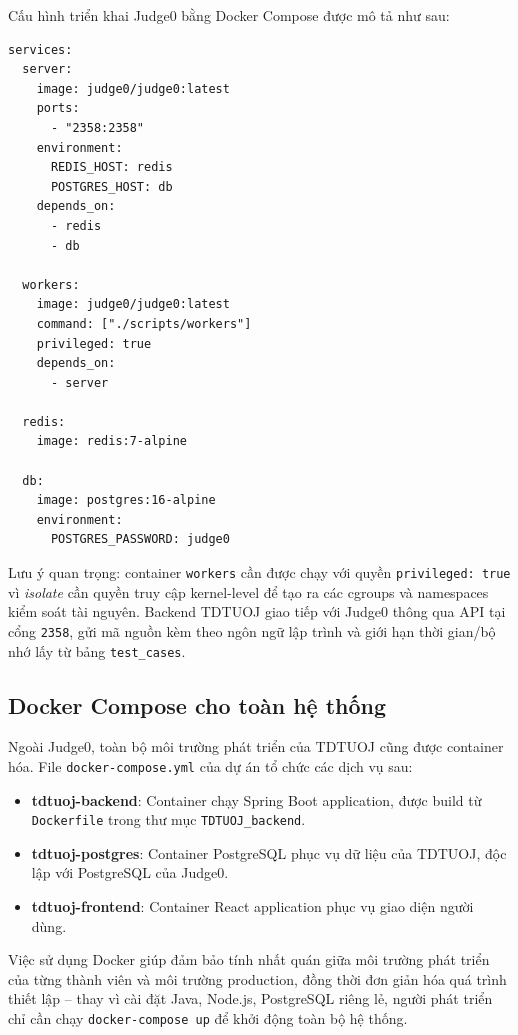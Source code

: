 \documentclass[12pt, a4paper]{report}
\begin{document}
Cấu hình triển khai Judge0 bằng Docker Compose được mô tả như sau:

\begin{verbatim}
services:
  server:
    image: judge0/judge0:latest
    ports:
      - "2358:2358"
    environment:
      REDIS_HOST: redis
      POSTGRES_HOST: db
    depends_on:
      - redis
      - db

  workers:
    image: judge0/judge0:latest
    command: ["./scripts/workers"]
    privileged: true
    depends_on:
      - server

  redis:
    image: redis:7-alpine

  db:
    image: postgres:16-alpine
    environment:
      POSTGRES_PASSWORD: judge0
\end{verbatim}

Lưu ý quan trọng: container \texttt{workers} cần được chạy với quyền \texttt{privileged: true} vì \textit{isolate} cần quyền truy cập kernel-level để tạo ra các cgroups và namespaces kiểm soát tài nguyên. Backend TDTUOJ giao tiếp với Judge0 thông qua \ac{API} tại cổng \texttt{2358}, gửi mã nguồn kèm theo ngôn ngữ lập trình và giới hạn thời gian/bộ nhớ lấy từ bảng \texttt{test\_cases}.

\subsection{Docker Compose cho toàn hệ thống}

Ngoài Judge0, toàn bộ môi trường phát triển của TDTUOJ cũng được container hóa. File \texttt{docker-compose.yml} của dự án tổ chức các dịch vụ sau:

\begin{itemize}
  \item \textbf{tdtuoj-backend}: Container chạy Spring Boot application, được build từ \texttt{Dockerfile} trong thư mục \texttt{TDTUOJ\_backend}.
  \item \textbf{tdtuoj-postgres}: Container PostgreSQL phục vụ dữ liệu của TDTUOJ, độc lập với PostgreSQL của Judge0.
  \item \textbf{tdtuoj-frontend}: Container React application phục vụ giao diện người dùng.
\end{itemize}

Việc sử dụng Docker giúp đảm bảo tính nhất quán giữa môi trường phát triển của từng thành viên và môi trường production, đồng thời đơn giản hóa quá trình thiết lập -- thay vì cài đặt Java, Node.js, PostgreSQL riêng lẻ, người phát triển chỉ cần chạy \texttt{docker-compose up} để khởi động toàn bộ hệ thống.
\end{document}
